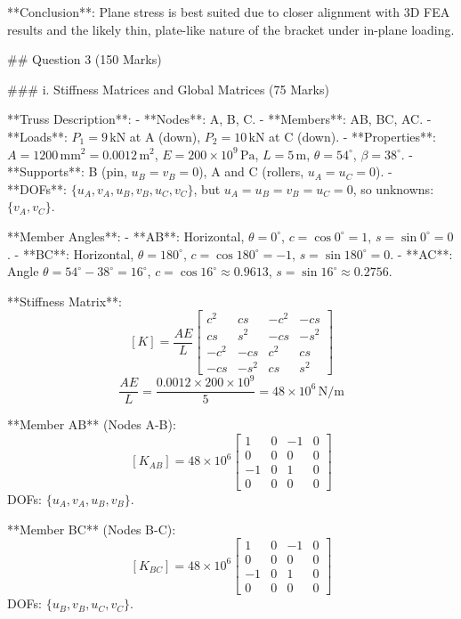 **Conclusion**:
Plane stress is best suited due to closer alignment with 3D FEA results and the likely thin, plate-like nature of the bracket under in-plane loading.

## Question 3 (150 Marks)

### i. Stiffness Matrices and Global Matrices (75 Marks)

**Truss Description**:
- **Nodes**: A, B, C.
- **Members**: AB, BC, AC.
- **Loads**: \( P_1 = 9 \, \text{kN} \) at A (down), \( P_2 = 10 \, \text{kN} \) at C (down).
- **Properties**: \( A = 1200 \, \text{mm}^2 = 0.0012 \, \text{m}^2 \), \( E = 200 \times 10^9 \, \text{Pa} \), \( L = 5 \, \text{m} \), \( \theta = 54^\circ \), \( \beta = 38^\circ \).
- **Supports**: B (pin, \( u_B = v_B = 0 \)), A and C (rollers, \( u_A = u_C = 0 \)).
- **DOFs**: \( \{ u_A, v_A, u_B, v_B, u_C, v_C \} \), but \( u_A = u_B = v_B = u_C = 0 \), so unknowns: \( \{ v_A, v_C \} \).

**Member Angles**:
- **AB**: Horizontal, \( \theta = 0^\circ \), \( c = \cos 0^\circ = 1 \), \( s = \sin 0^\circ = 0 \).
- **BC**: Horizontal, \( \theta = 180^\circ \), \( c = \cos 180^\circ = -1 \), \( s = \sin 180^\circ = 0 \).
- **AC**: Angle \( \theta = 54^\circ - 38^\circ = 16^\circ \), \( c = \cos 16^\circ \approx 0.9613 \), \( s = \sin 16^\circ \approx 0.2756 \).

**Stiffness Matrix**:
\[
[K] = \frac{A E}{L} \begin{bmatrix} c^2 & c s & -c^2 & -c s \\ c s & s^2 & -c s & -s^2 \\ -c^2 & -c s & c^2 & c s \\ -c s & -s^2 & c s & s^2 \end{bmatrix}
\]
\[
\frac{A E}{L} = \frac{0.0012 \times 200 \times 10^9}{5} = 48 \times 10^6 \, \text{N/m}
\]

**Member AB** (Nodes A-B):
\[
[K_{AB}] = 48 \times 10^6 \begin{bmatrix} 1 & 0 & -1 & 0 \\ 0 & 0 & 0 & 0 \\ -1 & 0 & 1 & 0 \\ 0 & 0 & 0 & 0 \end{bmatrix}
\]
DOFs: \( \{ u_A, v_A, u_B, v_B \} \).

**Member BC** (Nodes B-C):
\[
[K_{BC}] = 48 \times 10^6 \begin{bmatrix} 1 & 0 & -1 & 0 \\ 0 & 0 & 0 & 0 \\ -1 & 0 & 1 & 0 \\ 0 & 0 & 0 & 0 \end{bmatrix}
\]
DOFs: \( \{ u_B, v_B, u_C, v_C \} \).

